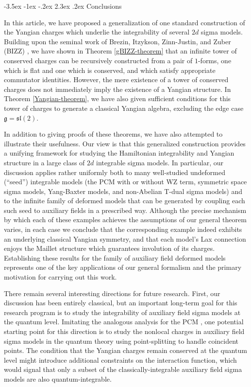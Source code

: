 \documentclass[12pt]{article}
\makeatletter
\renewcommand\section{\@startsection {section}{1}{\z@}%
                                   {-3.5ex \@plus -1ex \@minus -.2ex}%
                                   {2.3ex \@plus.2ex}%
                                   {\normalfont\large\bfseries}}
\numberwithin{equation}{section}
\makeatother
\begin{document}
\section{Conclusions}\label{section:conclusion}

In this article, we have proposed a generalization of one standard construction of the Yangian charges which underlie the integrability of several $2d$ sigma models. Building upon the seminal work of Brezin, Itzykson, Zinn-Justin, and Zuber (BIZZ) \cite{BREZIN1979442}, we have shown in Theorem \ref{gBIZZ-theorem} that an infinite tower of conserved charges can be recursively constructed from a pair of $1$-forms, one which is flat and one which is conserved, and which satisfy appropriate commutator identities. However, the mere existence of a tower of conserved charges does not immediately imply the existence of a Yangian structure. In Theorem \ref{Yangian-theorem}, we have also given sufficient conditions for this tower of charges to generate a classical Yangian algebra, excluding the edge case $\mathfrak{g} = \mathfrak{sl}(2)$.


In addition to giving proofs of these theorems, we have also attempted to illustrate their usefulness. Our view is that this generalized construction provides a unifying framework for studying the Hamiltonian integrability and Yangian structure in a large class of $2d$ integrable sigma models. In particular, our discussion applies rather uniformly both to many well-studied undeformed (``seed'') integrable models (the PCM with or without WZ term, symmetric space sigma models, Yang-Baxter models, and non-Abelian T-dual sigma models) and to the infinite family of deformed models that can be generated by coupling each such seed to auxiliary fields in a prescribed way. Although the precise mechanism by which each of these examples achieves the assumptions of our general theorem varies, in each case we conclude that the corresponding example indeed exhibits an underlying classical Yangian symmetry, and that each model's Lax connection enjoys the Maillet structure which guarantees involution of its charges. Establishing these results for the family of auxiliary field deformed models represents one of the key applications of our general formalism and the primary motivation for carrying out this work.

There remain several interesting directions for future research. First, our discussion has been entirely classical, but an important long-term goal for this research program is to study the integrability of auxiliary field sigma models at the quantum level. Imitating the analogous analysis for the PCM \cite{Luscher:1977uq}, one potential starting point for this direction is to study the nonlocal charges in auxiliary field sigma models in the quantum theory using point-splitting to handle coincident points. The condition that the Yangian charges remain conserved at the quantum level might introduce additional constraints on the interaction function, which would signal that only a subset of the classically-integrable auxiliary field sigma models are also quantum-integrable.
\end{document}
